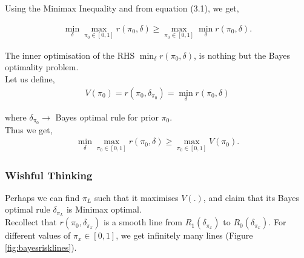 \documentclass[12pt]{report}
\begin{document}
 
	\noindent Using the Minimax Inequality and from equation (3.1), we get,
	
	\begin{align*}
		\min_{\delta} \max_{\pi_0 \in [0,1]} r(\pi_0,\delta) \geq \max_{\pi_0 \in [0,1]} \min_{\delta} r(\pi_0,\delta).
	\end{align*}
	
	\noindent The inner optimisation of the RHS $\min_\delta r(\pi_0,\delta)$, is nothing but the Bayes optimality problem.\\
	
	\noindent Let us define,
	\begin{align*}
		V(\pi_0) = r(\pi_0,\delta_{\pi_0}) = \min_{\delta} r(\pi_0,\delta)
	\end{align*}
	
	where $\delta_{\pi_0} \to$ Bayes optimal rule for prior $\pi_0$.\\
	
	\noindent Thus we get,
	\begin{align}
		\min_{\delta} \max_{\pi_0 \in [0,1]} r(\pi_0,\delta) \geq \max_{\pi_0 \in [0,1]} V(\pi_0).
	\end{align}

\subsubsection{Wishful Thinking}

Perhaps we can find $\pi_L$ such that it maximises $V(.)$, and claim that its Bayes optimal rule $\delta_{\pi_L}$ is Minimax optimal.\\

\noindent Recollect that $r(\pi_0,\delta_{\pi_x})$ is a smooth line from $R_1(\delta_{\pi_x})$ to $R_0(\delta_{\pi_x})$. For different values of $\pi_x \in [0,1]$, we get infinitely many lines (Figure \ref{fig:bayesrisklines}).
\end{document}
